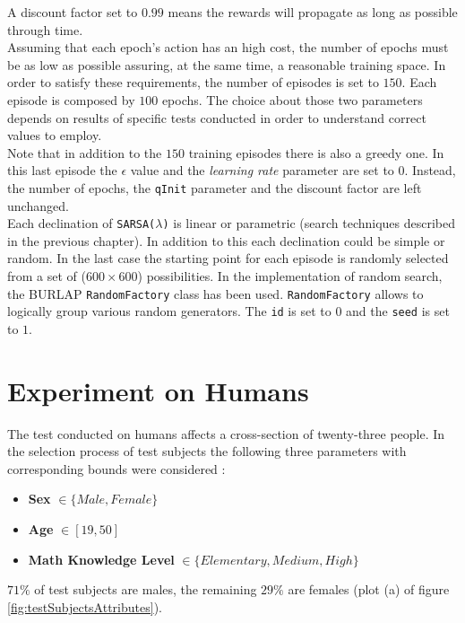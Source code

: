 A discount factor set to $0.99$ means the rewards will propagate as long as possible through time. \\

Assuming that each epoch's action has an high cost, the number of epochs must be as low as possible assuring, at the same time, a reasonable training space. In order to satisfy these requirements, the number of episodes is set to $150$. Each episode is composed by $100$ epochs. The choice about those two parameters depends on results of specific tests conducted in order to understand correct values to employ. \\

Note that in addition to the $150$ training episodes there is also a greedy one. In this last episode the $\epsilon$ value and the \textit{learning rate} parameter are set to $0$. Instead, the number of epochs, the {\tt qInit} parameter and the discount factor are left unchanged.  \\

Each declination of {\tt SARSA(\textit{$\lambda$})} is linear or parametric (search techniques described in the previous chapter). In addition to this each declination could be simple or random. In the last case the starting point for each episode is randomly selected from a set of ($600 \times 600$) possibilities. In the implementation of random search, the BURLAP {\tt RandomFactory} class has been used. {\tt RandomFactory} allows to logically group various random generators. The {\tt id} is set to $0$ and the {\tt seed} is set to $1$.

\section{Experiment on Humans}

The test conducted on humans affects a cross-section of twenty-three people. In the selection process of test subjects the following three parameters with corresponding bounds were considered :

\begin{itemize}
	\item \textbf{Sex} $\in \{Male, Female\}$
	\item \textbf{Age} $\in [19, 50]$
	\item \textbf{Math Knowledge Level} $\in \{Elementary, Medium, High\}$ 
\end{itemize} 

$71\%$ of test subjects are males, the remaining $29\%$ are females (plot (a) of figure \ref{fig:testSubjectsAttributes}). \\

